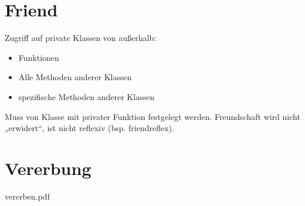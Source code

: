 \section{Friend}
Zugriff auf private Klassen von außerhalb:
\begin{itemize}
\item Funktionen
\item Alle Methoden anderer Klassen
\item spezifische Methoden anderer Klassen
\end{itemize}
Muss von Klasse mit privater Funktion festgelegt werden. Freundschaft wird nicht „erwidert“, ist nicht reflexiv (bsp. friendreflex).

\section{Vererbung}
vererben.pdf

















\newpage
\printbibliography
